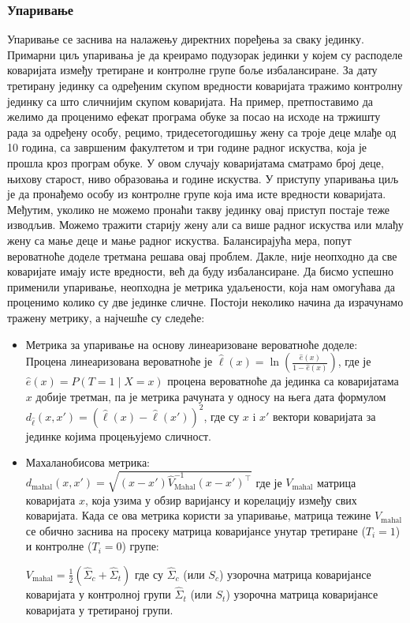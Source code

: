 \documentclass[12pt, a4paper]{article}
\begin{document}
\subsubsection{Упаривање}
Упаривање се заснива на налажењу директних поређења за сваку јединку.  Примарни циљ упаривања је да креирамо подузорак јединки у којем су расподеле коваријата између третиране и контролне групе боље избалансиране. За дату третирану јединку са одређеним скупом вредности коваријата тражимо контролну јединку са што сличнијим скупом коваријата. На пример, претпоставимо да желимо да проценимо ефекат програма обуке за посао на исходе на тржишту рада за одређену особу, рецимо, тридесетогодишњу жену са троје деце млађе од 10 година, са завршеним факултетом и три године радног искуства, која је прошла кроз програм обуке. У овом случају коваријатама сматрамо број деце, њихову старост, ниво образовања и године искуства. У приступу упаривања циљ је да пронађемо особу из контролне групе која има исте вредности коваријата. Међутим, уколико не можемо пронаћи такву јединку овај приступ постаје теже изводљив. Можемо тражити старију жену али са више радног искуства или млађу жену са мање деце и мање радног искуства. Балансирајућа мера, попут вероватноће доделе третмана решава овај проблем. Дакле, није неопходно да све коваријате имају исте вредности, већ да буду избалансиране. Да бисмо успешно применили упаривање, неопходна је метрика удаљености, која нам омогућава да проценимо колико су две јединке сличне. Постоји неколико начина да израчунамо тражену метрику, а најчешће су следеће:
\begin{itemize}
  \item  Метрика за упаривање на основу линеаризоване вероватноће доделе:\\
Процена линеаризована вероватноће је $\hat \ell(x) = \ln\left(\frac{\hat e(x)}{1 - \hat e(x)}\right)$, где је $\hat e(x) = P(T = 1 \mid X = x)$ процена вероватноће да јединка са коваријатама $x$ добије третман, па је метрика рачуната у односу на њега дата формулом $d_{\hat \ell}(x, x') = (\hat \ell(x) - \hat \ell(x'))^2$, где су $x$ i $x'$ вектори коваријата за јединке којима процењујемо сличност.
  \item  Махаланобисова метрика:\\ $d_{\text{mahal}}(x, x') = \sqrt{(x - x') \hat{V}_{\text{Mahal}}^{-1} (x - x')^\top}$ где је  $V_{\text{mahal}}$ матрица коваријата $x$, која узима у обзир варијансу и корелацију између свих коваријата. Када се ова метрика користи за упаривање, матрица тежине $V_{\text{mahal}}$ се обично заснива на просеку матрица коваријансе унутар третиране ($T_i=1$) и контролне ($T_i=0$) групе:

$V_{\text{mahal}} = \frac{1}{2} \left( \hat{\Sigma}_c + \hat{\Sigma}_t \right)$ где су  $\hat{\Sigma}_c$ (или $S_c$) узорочна матрица коваријансе коваријата у контролној групи  $\hat{\Sigma}_t$ (или $S_t$) узорочна матрица коваријансе коваријата у третираној групи.
\end{itemize}
\end{document}
